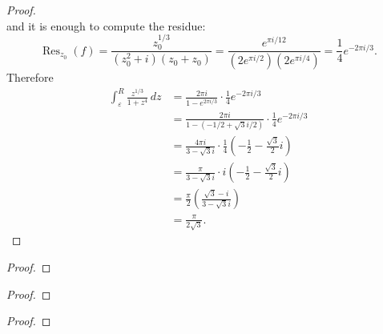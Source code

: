 \documentclass{article}
\newenvironment{problem}[2][Problem]{\begin{trivlist}
\item[\hskip \labelsep {\bfseries #1}\hskip \labelsep {\bfseries #2.}]}{\end{trivlist}}
\begin{document}
\begin{proof}
\[  \] and it is enough to compute the residue: \[
    \operatorname{Res}_{z_0}(f)
    = \frac{z_0^{1/3}}{(z_0^2 + i)(z_0 + z_0)}
    = \frac{e^{\pi i/12}}{(2e^{\pi i/2})(2e^{\pi i/4})}
    = \frac{1}{4} e^{-2\pi i/3}.
  \]
  Therefore \begin{align*}
    \int_\varepsilon^R\frac{z^{1/3}}{1 + {z^4}}\,dz
    &= \frac{2\pi i}{1 - e^{2\pi i/3}}\cdot\frac{1}{4} e^{-2\pi i/3}\\
    &= \frac{2\pi i}{1 - (-1/2 + \sqrt{3}i/2)}\cdot\frac{1}{4} e^{-2\pi i/3}\\
    &= \frac{4\pi i}{3 - \sqrt{3}i} \cdot\frac{1}{4}\left(-\frac{1}{2} - \frac{\sqrt{3}}{2}i\right)\\
    &= \frac{\pi}{3 - \sqrt{3}i} \cdot i\left(-\frac{1}{2} - \frac{\sqrt{3}}{2}i\right)\\
    &= \frac{\pi}{2} \left(\frac{\sqrt3-i}{3 - \sqrt{3}i}\right)\\
    &= \frac{\pi}{2\sqrt3}.
  \end{align*}
\end{proof}
\pagebreak

\begin{problem}{2}
\end{problem}

\begin{proof}
\end{proof}

\pagebreak

\begin{problem}{3}
\end{problem}

\begin{proof}
\end{proof}

\pagebreak

\begin{problem}{4}
\end{problem}

\begin{proof}
\end{proof}
\end{document}
